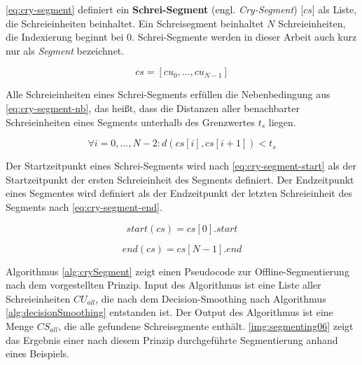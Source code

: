 \autoref{eq:cry-segment} definiert ein \textbf{Schrei-Segment} (engl. \emph{Cry-Segment}) [$cs$] als Liste, die Schreieinheiten beinhaltet. Ein Schreisegment beinhaltet $N$ Schreieinheiten, die Indexierung beginnt bei 0. Schrei-Segmente werden in dieser Arbeit auch kurz nur als \emph{Segment} bezeichnet.

\begin{equation}
cs = [cu_0 ,  \ldots,  cu_{N-1}]
\label{eq:cry-segment}
\end{equation}

Alle Schreieinheiten eines Schrei-Segments erfüllen die Nebenbedingung aus \autoref{eq:cry-segment-nb}, das heißt, dass die Distanzen aller benachbarter Schreieinheiten eines Segments unterhalb des Grenzwertes $t_{s}$ liegen.


\begin{equation}
\forall i = 0 , \ldots , N-2 : d(cs[i], cs[i+1]) < t_{s}
\label{eq:cry-segment-nb}
\end{equation}

Der Startzeitpunkt eines Schrei-Segments wird nach \autoref{eq:cry-segment-start} als der Startzeitpunkt der ersten Schreieinheit des Segments definiert. Der Endzeitpunkt eines Segmentes wird definiert als der Endzeitpunkt der letzten Schreieinheit des Segments nach \autoref{eq:cry-segment-end}.

\begin{equation}
start(cs) = cs[0].start
\label{eq:cry-segment-start}
\end{equation}

\begin{equation}
end(cs) = cs[N-1].end
\label{eq:cry-segment-end}
\end{equation}

Algorithmus \ref{alg:crySegment} zeigt einen Pseudocode zur Offline-Segmentierung nach dem vorgestellten Prinzip. Input des Algorithmus ist eine Liste aller Schreieinheiten $CU_{all}$, die nach dem Decision-Smoothing nach Algorithmus \ref{alg:decisionSmoothing} entstanden ist. Der Output des Algorithmus ist eine Menge $CS_{all}$, die alle gefundene Schreisegmente enthält. \autoref{img:segmenting06} zeigt das Ergebnis einer nach diesem Prinzip durchgeführte Segmentierung anhand eines Beispiels.

